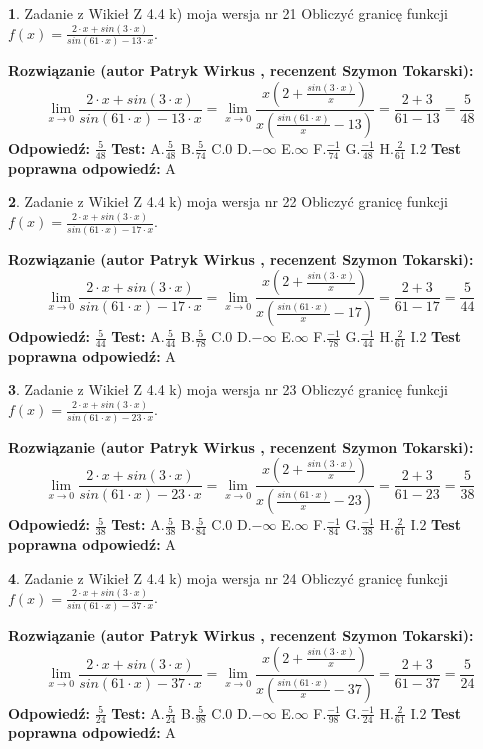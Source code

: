\documentclass[12pt, a4paper]{article}
\theoremstyle{definition} %
\newtheorem{zad}{}
\newcommand{\zadStart}[1]{\begin{zad}#1\newline}
\newcommand{\zadStop}{\end{zad}}
\newcommand{\rozwStart}[2]{\noindent \textbf{Rozwiązanie (autor #1 , recenzent #2): }\newline}
\newcommand{\rozwStop}{\newline}
\newcommand{\odpStart}{\noindent \textbf{Odpowiedź:}\newline}
\newcommand{\odpStop}{\newline}
\newcommand{\testStart}{\noindent \textbf{Test:}\newline}
\newcommand{\testStop}{\newline}
\newcommand{\kluczStart}{\noindent \textbf{Test poprawna odpowiedź:}\newline}
\newcommand{\kluczStop}{\newline}
\begin{document}
\zadStart{Zadanie z Wikieł Z 4.4 k) moja wersja nr 21}
Obliczyć granicę funkcji $f(x)=\frac{2\cdot x +sin(3\cdot x)}{sin(61\cdot x) -13\cdot x}$.
\zadStop
\rozwStart{Patryk Wirkus}{Szymon Tokarski}
$$\lim\limits_{x\to 0}\frac{2\cdot x +sin(3\cdot x)}{sin(61\cdot x) -13\cdot x}
=\lim\limits_{x\to 0}\frac{x(2+\frac{sin(3\cdot x)}{x})}{x(\frac{sin(61\cdot x)}{x}-13)}
=\frac{2+3}{61-13} = \frac{5}{48}$$
\rozwStop
\odpStart
$\frac{5}{48}$
\odpStop
\testStart
A.$\frac{5}{48}$
B.$\frac{5}{74}$
C.$0$
D.$-\infty$
E.$\infty$
F.$\frac{-1}{74}$
G.$\frac{-1}{48}$
H.$\frac{2}{61}$
I.$2$
\testStop
\kluczStart
A
\kluczStop



\zadStart{Zadanie z Wikieł Z 4.4 k) moja wersja nr 22}
Obliczyć granicę funkcji $f(x)=\frac{2\cdot x +sin(3\cdot x)}{sin(61\cdot x) -17\cdot x}$.
\zadStop
\rozwStart{Patryk Wirkus}{Szymon Tokarski}
$$\lim\limits_{x\to 0}\frac{2\cdot x +sin(3\cdot x)}{sin(61\cdot x) -17\cdot x}
=\lim\limits_{x\to 0}\frac{x(2+\frac{sin(3\cdot x)}{x})}{x(\frac{sin(61\cdot x)}{x}-17)}
=\frac{2+3}{61-17} = \frac{5}{44}$$
\rozwStop
\odpStart
$\frac{5}{44}$
\odpStop
\testStart
A.$\frac{5}{44}$
B.$\frac{5}{78}$
C.$0$
D.$-\infty$
E.$\infty$
F.$\frac{-1}{78}$
G.$\frac{-1}{44}$
H.$\frac{2}{61}$
I.$2$
\testStop
\kluczStart
A
\kluczStop



\zadStart{Zadanie z Wikieł Z 4.4 k) moja wersja nr 23}
Obliczyć granicę funkcji $f(x)=\frac{2\cdot x +sin(3\cdot x)}{sin(61\cdot x) -23\cdot x}$.
\zadStop
\rozwStart{Patryk Wirkus}{Szymon Tokarski}
$$\lim\limits_{x\to 0}\frac{2\cdot x +sin(3\cdot x)}{sin(61\cdot x) -23\cdot x}
=\lim\limits_{x\to 0}\frac{x(2+\frac{sin(3\cdot x)}{x})}{x(\frac{sin(61\cdot x)}{x}-23)}
=\frac{2+3}{61-23} = \frac{5}{38}$$
\rozwStop
\odpStart
$\frac{5}{38}$
\odpStop
\testStart
A.$\frac{5}{38}$
B.$\frac{5}{84}$
C.$0$
D.$-\infty$
E.$\infty$
F.$\frac{-1}{84}$
G.$\frac{-1}{38}$
H.$\frac{2}{61}$
I.$2$
\testStop
\kluczStart
A
\kluczStop



\zadStart{Zadanie z Wikieł Z 4.4 k) moja wersja nr 24}
Obliczyć granicę funkcji $f(x)=\frac{2\cdot x +sin(3\cdot x)}{sin(61\cdot x) -37\cdot x}$.
\zadStop
\rozwStart{Patryk Wirkus}{Szymon Tokarski}
$$\lim\limits_{x\to 0}\frac{2\cdot x +sin(3\cdot x)}{sin(61\cdot x) -37\cdot x}
=\lim\limits_{x\to 0}\frac{x(2+\frac{sin(3\cdot x)}{x})}{x(\frac{sin(61\cdot x)}{x}-37)}
=\frac{2+3}{61-37} = \frac{5}{24}$$
\rozwStop
\odpStart
$\frac{5}{24}$
\odpStop
\testStart
A.$\frac{5}{24}$
B.$\frac{5}{98}$
C.$0$
D.$-\infty$
E.$\infty$
F.$\frac{-1}{98}$
G.$\frac{-1}{24}$
H.$\frac{2}{61}$
I.$2$
\testStop
\kluczStart
A
\kluczStop
\end{document}
